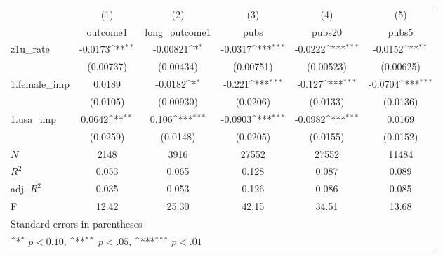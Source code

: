 {
\def\sym#1{\ifmmode^{#1}\else\(^{#1}\)\fi}
\begin{tabular}{l*{5}{c}}
\hline\hline
            &\multicolumn{1}{c}{(1)}&\multicolumn{1}{c}{(2)}&\multicolumn{1}{c}{(3)}&\multicolumn{1}{c}{(4)}&\multicolumn{1}{c}{(5)}\\
            &\multicolumn{1}{c}{outcome1}&\multicolumn{1}{c}{long\_outcome1}&\multicolumn{1}{c}{pubs}&\multicolumn{1}{c}{pubs20}&\multicolumn{1}{c}{pubs5}\\
\hline
z1u\_rate    &     -0.0173\sym{**} &    -0.00821\sym{*}  &     -0.0317\sym{***}&     -0.0222\sym{***}&     -0.0152\sym{**} \\
            &   (0.00737)         &   (0.00434)         &   (0.00751)         &   (0.00523)         &   (0.00625)         \\
[1em]
1.female\_imp&      0.0189         &     -0.0182\sym{*}  &      -0.221\sym{***}&      -0.127\sym{***}&     -0.0704\sym{***}\\
            &    (0.0105)         &   (0.00930)         &    (0.0206)         &    (0.0133)         &    (0.0136)         \\
[1em]
1.usa\_imp   &      0.0642\sym{**} &       0.106\sym{***}&     -0.0903\sym{***}&     -0.0982\sym{***}&      0.0169         \\
            &    (0.0259)         &    (0.0148)         &    (0.0205)         &    (0.0155)         &    (0.0152)         \\
\hline
\(N\)       &        2148         &        3916         &       27552         &       27552         &       11484         \\
\(R^{2}\)   &       0.053         &       0.065         &       0.128         &       0.087         &       0.089         \\
adj. \(R^{2}\)&       0.035         &       0.053         &       0.126         &       0.086         &       0.085         \\
F           &       12.42         &       25.30         &       42.15         &       34.51         &       13.68         \\
\hline\hline
\multicolumn{6}{l}{\footnotesize Standard errors in parentheses}\\
\multicolumn{6}{l}{\footnotesize \sym{*} \(p<0.10\), \sym{**} \(p<.05\), \sym{***} \(p<.01\)}\\
\end{tabular}
}
